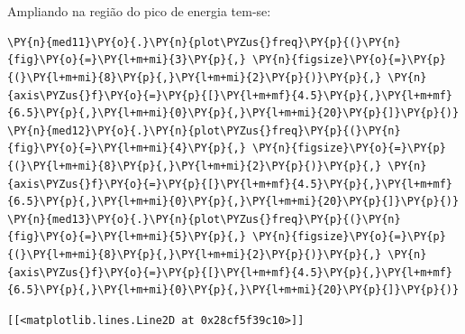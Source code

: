     \begin{center}
    \end{center}
    { \hspace*{\fill} \\}
    
    \begin{center}
    \end{center}
    { \hspace*{\fill} \\}
    
    Ampliando na região do pico de energia tem-se:

    \begin{tcolorbox}[breakable, size=fbox, boxrule=1pt, pad at break*=1mm,colback=cellbackground, colframe=cellborder]
\begin{Verbatim}[commandchars=\\\{\}]
\PY{n}{med11}\PY{o}{.}\PY{n}{plot\PYZus{}freq}\PY{p}{(}\PY{n}{fig}\PY{o}{=}\PY{l+m+mi}{3}\PY{p}{,} \PY{n}{figsize}\PY{o}{=}\PY{p}{(}\PY{l+m+mi}{8}\PY{p}{,}\PY{l+m+mi}{2}\PY{p}{)}\PY{p}{,} \PY{n}{axis\PYZus{}f}\PY{o}{=}\PY{p}{[}\PY{l+m+mf}{4.5}\PY{p}{,}\PY{l+m+mf}{6.5}\PY{p}{,}\PY{l+m+mi}{0}\PY{p}{,}\PY{l+m+mi}{20}\PY{p}{]}\PY{p}{)}
\PY{n}{med12}\PY{o}{.}\PY{n}{plot\PYZus{}freq}\PY{p}{(}\PY{n}{fig}\PY{o}{=}\PY{l+m+mi}{4}\PY{p}{,} \PY{n}{figsize}\PY{o}{=}\PY{p}{(}\PY{l+m+mi}{8}\PY{p}{,}\PY{l+m+mi}{2}\PY{p}{)}\PY{p}{,} \PY{n}{axis\PYZus{}f}\PY{o}{=}\PY{p}{[}\PY{l+m+mf}{4.5}\PY{p}{,}\PY{l+m+mf}{6.5}\PY{p}{,}\PY{l+m+mi}{0}\PY{p}{,}\PY{l+m+mi}{20}\PY{p}{]}\PY{p}{)}
\PY{n}{med13}\PY{o}{.}\PY{n}{plot\PYZus{}freq}\PY{p}{(}\PY{n}{fig}\PY{o}{=}\PY{l+m+mi}{5}\PY{p}{,} \PY{n}{figsize}\PY{o}{=}\PY{p}{(}\PY{l+m+mi}{8}\PY{p}{,}\PY{l+m+mi}{2}\PY{p}{)}\PY{p}{,} \PY{n}{axis\PYZus{}f}\PY{o}{=}\PY{p}{[}\PY{l+m+mf}{4.5}\PY{p}{,}\PY{l+m+mf}{6.5}\PY{p}{,}\PY{l+m+mi}{0}\PY{p}{,}\PY{l+m+mi}{20}\PY{p}{]}\PY{p}{)}
\end{Verbatim}
\end{tcolorbox}

            \begin{tcolorbox}[breakable, size=fbox, boxrule=.5pt, pad at break*=1mm, opacityfill=0]
\begin{Verbatim}[commandchars=\\\{\}]
[[<matplotlib.lines.Line2D at 0x28cf5f39c10>]]
\end{Verbatim}
\end{tcolorbox}
        
